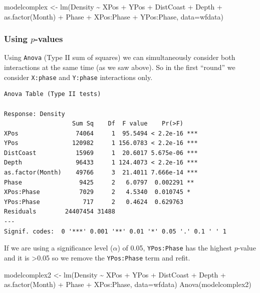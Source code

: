 \documentclass[
  oneside]{krantz}
\newenvironment{Shaded}{\begin{snugshade}}{\end{snugshade}}
\newcommand{\AttributeTok}[1]{\textcolor[rgb]{0.77,0.63,0.00}{#1}}
\newcommand{\FunctionTok}[1]{\textcolor[rgb]{0.00,0.00,0.00}{#1}}
\newcommand{\NormalTok}[1]{#1}
\newcommand{\OtherTok}[1]{\textcolor[rgb]{0.56,0.35,0.01}{#1}}
\newcommand{\SpecialCharTok}[1]{\textcolor[rgb]{0.00,0.00,0.00}{#1}}
\begin{document}
\begin{Shaded}
\begin{Highlighting}[]
\NormalTok{modelcomplex }\OtherTok{\textless{}{-}} \FunctionTok{lm}\NormalTok{(Density }\SpecialCharTok{\textasciitilde{}}\NormalTok{ XPos }\SpecialCharTok{+}\NormalTok{ YPos }\SpecialCharTok{+}\NormalTok{ DistCoast }\SpecialCharTok{+}\NormalTok{ Depth }\SpecialCharTok{+} 
                     \FunctionTok{as.factor}\NormalTok{(Month) }\SpecialCharTok{+}\NormalTok{  Phase }\SpecialCharTok{+}\NormalTok{ XPos}\SpecialCharTok{:}\NormalTok{Phase }\SpecialCharTok{+} 
\NormalTok{                     YPos}\SpecialCharTok{:}\NormalTok{Phase, }\AttributeTok{data=}\NormalTok{wfdata)}
\end{Highlighting}
\end{Shaded}

\hypertarget{using-p-values}{%
\subsubsection{\texorpdfstring{Using \(p\)-values}{Using p-values}}\label{using-p-values}}

Using \texttt{Anova} (Type II sum of squares) we can simultaneously consider both interactions at the same time (as we saw above). So in the first ``round'' we consider \texttt{X:phase} and \texttt{Y:phase} interactions only.

\begin{verbatim}
Anova Table (Type II tests)

Response: Density
                   Sum Sq    Df  F value    Pr(>F)    
XPos                74064     1  95.5494 < 2.2e-16 ***
YPos               120982     1 156.0783 < 2.2e-16 ***
DistCoast           15969     1  20.6017 5.675e-06 ***
Depth               96433     1 124.4073 < 2.2e-16 ***
as.factor(Month)    49766     3  21.4011 7.666e-14 ***
Phase                9425     2   6.0797  0.002291 ** 
XPos:Phase           7029     2   4.5340  0.010745 *  
YPos:Phase            717     2   0.4624  0.629763    
Residuals        24407454 31488                       
---
Signif. codes:  0 '***' 0.001 '**' 0.01 '*' 0.05 '.' 0.1 ' ' 1
\end{verbatim}

If we are using a significance level (\(\alpha\)) of 0.05, \texttt{YPos:Phase} has the highest \(p\)-value and it is \textgreater0.05 so we remove the \texttt{YPos:Phase} term and refit.

\begin{Shaded}
\begin{Highlighting}[]
\NormalTok{modelcomplex2 }\OtherTok{\textless{}{-}} \FunctionTok{lm}\NormalTok{(Density }\SpecialCharTok{\textasciitilde{}}\NormalTok{ XPos }\SpecialCharTok{+}\NormalTok{ YPos }\SpecialCharTok{+}\NormalTok{ DistCoast }\SpecialCharTok{+}\NormalTok{ Depth }\SpecialCharTok{+} 
                    \FunctionTok{as.factor}\NormalTok{(Month) }\SpecialCharTok{+}\NormalTok{ Phase }\SpecialCharTok{+}\NormalTok{ XPos}\SpecialCharTok{:}\NormalTok{Phase, }
                    \AttributeTok{data=}\NormalTok{wfdata)}
\FunctionTok{Anova}\NormalTok{(modelcomplex2)}
\end{Highlighting}
\end{Shaded}
\end{document}
